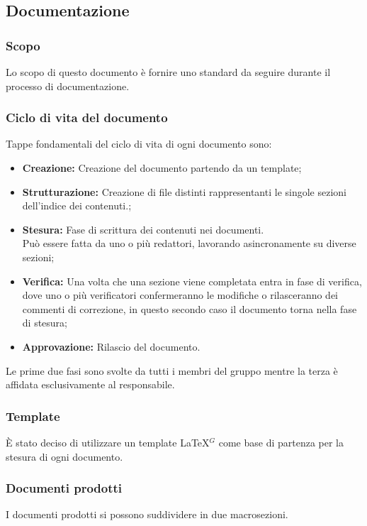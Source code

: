 \subsection{Documentazione}

\subsubsection{Scopo}
Lo scopo di questo documento è fornire uno standard da seguire durante il processo di documentazione.

\subsubsection{Ciclo di vita del documento}
Tappe fondamentali del ciclo di vita di ogni documento sono:
  \begin{itemize}
    \item \textbf{Creazione:} Creazione del documento partendo da un template;
    \item \textbf{Strutturazione:} Creazione di file distinti rappresentanti le singole sezioni dell'indice dei contenuti.;
    \item \textbf{Stesura:} Fase di scrittura dei contenuti nei documenti.\\ Può essere fatta da uno o più redattori, lavorando asincronamente su diverse sezioni;
    \item \textbf{Verifica:} Una volta che una sezione viene completata entra in fase di verifica, dove uno o più verificatori confermeranno le modifiche o rilasceranno dei commenti di correzione, in questo secondo caso il documento torna nella fase di stesura;
    \item \textbf{Approvazione:} Rilascio del documento.
  \end{itemize}
  Le prime due fasi sono svolte da tutti i membri del gruppo mentre la terza è affidata esclusivamente al responsabile.

\subsubsection{Template}
È stato deciso di utilizzare un template \LaTeX$^{G}$ come base di partenza per la stesura di ogni documento.

\subsubsection{Documenti prodotti}
I documenti prodotti si possono suddividere in due macrosezioni.

